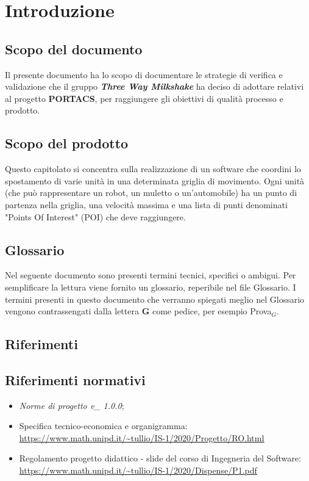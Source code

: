 \section{Introduzione}
\subsection{Scopo del documento}
Il presente documento ha lo scopo di documentare le strategie di verifica e validazione che il gruppo \textbf{\textit{Three Way Milkshake}} ha deciso di adottare relativi al progetto \textbf{PORTACS}, per raggiungere gli obiettivi di qualità processo e prodotto.

\subsection{Scopo del prodotto}
Questo capitolato si concentra sulla realizzazione di un software che coordini lo spostamento di varie unità in una determinata griglia di movimento.
Ogni unità (che può rappresentare un robot, un muletto o un'automobile) ha un punto di partenza nella griglia, una velocità massima e una lista di punti denominati "Points Of Interest" (POI) che deve raggiungere.\\

\subsection{Glossario}
Nel seguente documento sono presenti termini tecnici, specifici o ambigui. Per semplificare la lettura viene fornito un glossario, reperibile nel file Glossario. I termini presenti in questo documento che verranno spiegati meglio nel Glossario vengono contrassengati dalla lettera \textbf{G} come pedice, per esempio Prova$_G$.
\subsection{Riferimenti}

\subsection{Riferimenti normativi}
\begin{itemize}
	\item \textit{Norme di progetto v\_ 1.0.0};
	\item Specifica tecnico-economica e organigramma: \\ \uline{\url{https://www.math.unipd.it/~tullio/IS-1/2020/Progetto/RO.html}}
	\item Regolamento progetto didattico - slide del corso di Ingegneria del Software: \\ \uline{\url{https://www.math.unipd.it/~tullio/IS-1/2020/Dispense/P1.pdf}}
\end{itemize}
